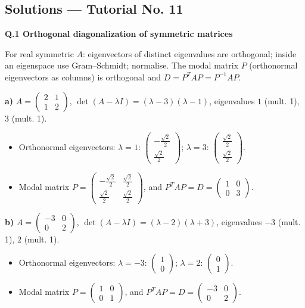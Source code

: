 \subsection*{Solutions --- Tutorial No. 11}
\medskip\noindent\textbf{Q.1  Orthogonal diagonalization of symmetric matrices}\par\smallskip
For real symmetric $A$: eigenvectors of distinct eigenvalues are orthogonal; inside an eigenspace use Gram--Schmidt; normalise. The modal matrix $P$ (orthonormal eigenvectors as columns) is orthogonal and $D=P^TAP=P^{-1}AP$.

\noindent\textbf{a)} $A=\begin{pmatrix}2 & 1 \\ 1 & 2\end{pmatrix}$, $\det(A-\lambda I)=\left(\lambda - 3\right) \left(\lambda - 1\right)$, eigenvalues $1$ (mult. 1), $3$ (mult. 1).
\begin{itemize}\item Orthonormal eigenvectors: $\lambda=1$: $\begin{pmatrix}- \frac{\sqrt{2}}{2} \\ \frac{\sqrt{2}}{2}\end{pmatrix}$; $\lambda=3$: $\begin{pmatrix}\frac{\sqrt{2}}{2} \\ \frac{\sqrt{2}}{2}\end{pmatrix}$.
\item Modal matrix $P=\begin{pmatrix}- \frac{\sqrt{2}}{2} & \frac{\sqrt{2}}{2} \\ \frac{\sqrt{2}}{2} & \frac{\sqrt{2}}{2}\end{pmatrix}$, and $P^TAP=D=\begin{pmatrix}1 & 0 \\ 0 & 3\end{pmatrix}$.\end{itemize}

\noindent\textbf{b)} $A=\begin{pmatrix}-3 & 0 \\ 0 & 2\end{pmatrix}$, $\det(A-\lambda I)=\left(\lambda - 2\right) \left(\lambda + 3\right)$, eigenvalues $-3$ (mult. 1), $2$ (mult. 1).
\begin{itemize}\item Orthonormal eigenvectors: $\lambda=-3$: $\begin{pmatrix}1 \\ 0\end{pmatrix}$; $\lambda=2$: $\begin{pmatrix}0 \\ 1\end{pmatrix}$.
\item Modal matrix $P=\begin{pmatrix}1 & 0 \\ 0 & 1\end{pmatrix}$, and $P^TAP=D=\begin{pmatrix}-3 & 0 \\ 0 & 2\end{pmatrix}$.\end{itemize}


